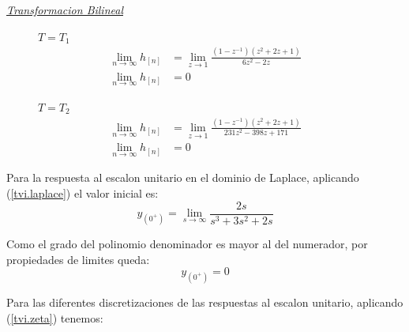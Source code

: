 \documentclass[a4paper,12pt]{report}
\begin{document}
\begin{enumerate}[label=\alph*), left=0pt]
                {\centering\underline{\textit{Transformacion Bilineal}}\par}
                \begin{figure}[h!]
                    \centering
                    \begin{minipage}{0.4\textwidth}
                        \centering
                        $T = T_1$
                        \begin{align*}
                            \lim_{n \to \infty} h_{[n]} &= \lim_{z \to 1}  \frac{\left(1 - z^{-1}\right) 
                                \left(z^2 + 2z + 1\right)}{6z^2 - 2z}\\
                            \lim_{n \to \infty} h_{[n]} &= 0
                        \end{align*}
                    \end{minipage}
                    \hspace{0.5cm}
                    \begin{minipage}{0.4\textwidth}
                        \centering
                        $T = T_2$
                        \begin{align*}
                            \lim_{n \to \infty} h_{[n]} &= \lim_{z \to 1} \frac{\left(1 - z^{-1}\right)
                                \left(z^2 + 2z + 1\right)}{231z^2 - 398z + 171}\\
                            \lim_{n \to \infty} h_{[n]} &= 0
                        \end{align*}
                    \end{minipage}
                \end{figure}

                Para la respuesta al escalon unitario en el dominio de Laplace, aplicando (\ref{tvi.laplace}) el valor inicial es:
                \begin{equation*}
                    y_{(0^+)} = \lim_{s \to \infty} \frac{2s}{s^3 + 3s^2 + 2s}
                \end{equation*}

                Como el grado del polinomio denominador es mayor al del numerador, por propiedades de limites queda:
                \begin{equation*}
                    y_{(0^+)} = 0
                \end{equation*}

                Para las diferentes discretizaciones de las respuestas al escalon unitario, aplicando (\ref{tvi.zeta}) tenemos:


\end{enumerate}
\end{document}
